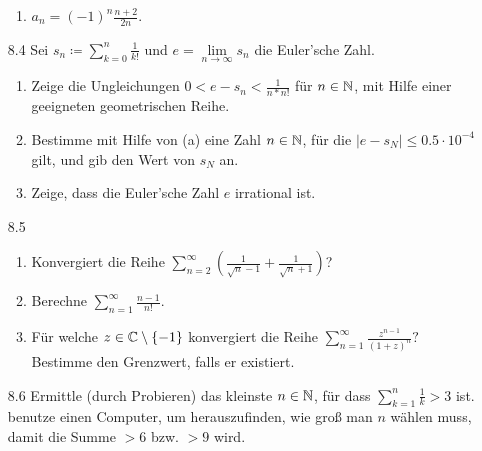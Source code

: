 \documentclass{HM}
\begin{document}
\begin{enumerate}
\begin{enumerate}
\item $a_n=(-1)^n\frac{n+2}{2n}$.
\end{enumerate}
\item[8.4] Sei $s_n\coloneqq \sum\limits_{k=0}^n\frac{1}{k!}$ und $e=\lim\limits_{n\to\infty}s_n$ die Euler'sche Zahl.
\begin{enumerate}
\item Zeige die Ungleichungen $0<e-s_n<\frac{1}{n*n!}$ für $n\in\mathbb{N}$, mit Hilfe einer geeigneten geometrischen Reihe.
\item Bestimme mit Hilfe von (a) eine Zahl $n\in\mathbb{N}$, für die $|e-s_N|\leq 0.5\cdot 10^{-4}$ gilt, und gib den Wert von $s_N$ an.
\item Zeige, dass die Euler'sche Zahl $e$ irrational ist.
\end{enumerate}
\item[8.5]
\begin{enumerate}
\item Konvergiert die Reihe $\sum\limits_{n=2}^\infty\left(\frac{1}{\sqrt{n}-1}+\frac{1}{\sqrt{n}+1}\right)$?
\item Berechne $\sum\limits_{n=1}^\infty\frac{n-1}{n!}$.
\item Für welche $z\in\mathbb{C}\setminus\lbrace-1\rbrace$ konvergiert die Reihe $\sum\limits_{n=1}^\infty\frac{z^{n-1}}{(1+z)^n}?$\\
Bestimme den Grenzwert, falls er existiert.
\end{enumerate}
\item[8.6] Ermittle (durch Probieren) das kleinste $n\in\mathbb{N}$, für dass $\sum\limits_{k=1}^n\frac{1}{k}>3$ ist. benutze einen Computer, um herauszufinden, wie groß man $n$ wählen muss, damit die Summe $>6$ bzw. $>9$ wird.
\end{enumerate}
\end{document}
